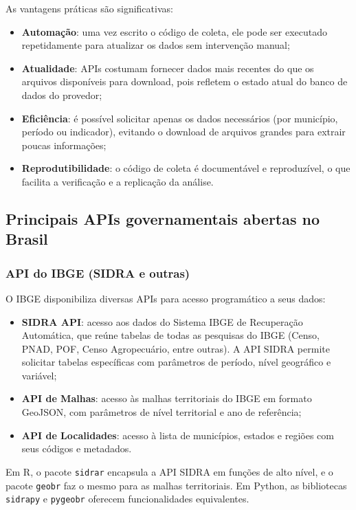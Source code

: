 As vantagens práticas são significativas:

\begin{itemize}
  \item \textbf{Automação}: uma vez escrito o código de coleta, ele pode ser executado repetidamente para atualizar os dados sem intervenção manual;
  \item \textbf{Atualidade}: APIs costumam fornecer dados mais recentes do que os arquivos disponíveis para download, pois refletem o estado atual do banco de dados do provedor;
  \item \textbf{Eficiência}: é possível solicitar apenas os dados necessários (por município, período ou indicador), evitando o download de arquivos grandes para extrair poucas informações;
  \item \textbf{Reprodutibilidade}: o código de coleta é documentável e reproduzível, o que facilita a verificação e a replicação da análise.
\end{itemize}

\subsection{Principais APIs governamentais abertas no Brasil}

\subsubsection{API do IBGE (SIDRA e outras)}

O IBGE disponibiliza diversas APIs para acesso programático a seus dados:

\begin{itemize}
  \item \textbf{SIDRA API}: acesso aos dados do Sistema IBGE de Recuperação Automática, que reúne tabelas de todas as pesquisas do IBGE (Censo, PNAD, POF, Censo Agropecuário, entre outras). A API SIDRA permite solicitar tabelas específicas com parâmetros de período, nível geográfico e variável;

  \item \textbf{API de Malhas}: acesso às malhas territoriais do IBGE em formato GeoJSON, com parâmetros de nível territorial e ano de referência;

  \item \textbf{API de Localidades}: acesso à lista de municípios, estados e regiões com seus códigos e metadados.
\end{itemize}

Em R, o pacote \texttt{sidrar} encapsula a API SIDRA em funções de alto nível, e o pacote \texttt{geobr} faz o mesmo para as malhas territoriais. Em Python, as bibliotecas \texttt{sidrapy} e \texttt{pygeobr} oferecem funcionalidades equivalentes.

